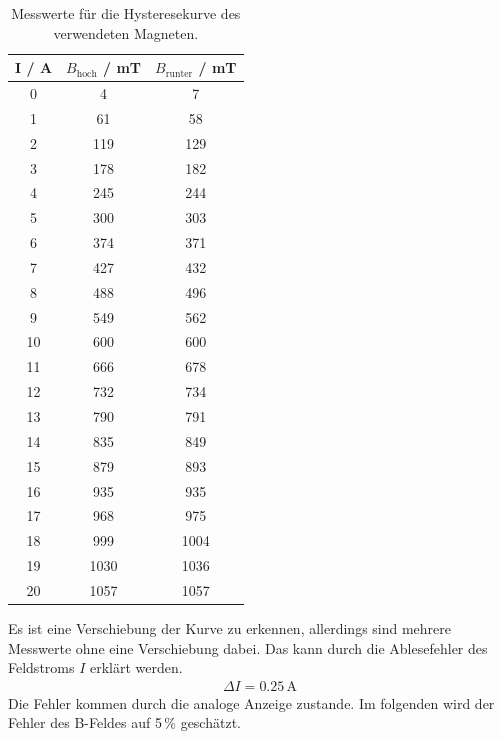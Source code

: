 \begin{table}[H] %
  \centering
  \caption{Messwerte für die Hysteresekurve des verwendeten Magneten.}
  \label{tab:Hysterese}
  \begin{tabular}{c | c c}
    I / A & $B_\text{hoch}$ / mT & $B_\text{runter}$ / mT \\
    \hline
    0 & 4 & 7 \\
    1 & 61 & 58 \\
    2 & 119 & 129 \\
    3 & 178 & 182 \\
    4 & 245 & 244 \\
    5 & 300 & 303 \\
    6 & 374 & 371 \\
    7 & 427 & 432 \\
    8 & 488 & 496 \\
    9 & 549 & 562 \\
    10 & 600 & 600 \\
    11 & 666 & 678 \\
    12 & 732 & 734 \\
    13 & 790 & 791 \\
    14 & 835 & 849 \\
    15 & 879 & 893 \\
    16 & 935 & 935 \\
    17 & 968 & 975 \\
    18 & 999 & 1004 \\
    19 & 1030 & 1036 \\
    20 & 1057 & 1057 \\
  \end{tabular}
\end{table}

Es ist eine Verschiebung der Kurve zu erkennen, allerdings sind mehrere Messwerte ohne eine Verschiebung dabei. Das kann durch die Ablesefehler des Feldstroms $I$ erklärt werden.
\begin{align*}
  \Delta I = 0.25\, \text{A}
\end{align*}
Die Fehler kommen durch die analoge Anzeige zustande. Im folgenden wird der Fehler des B-Feldes auf 5\,\% geschätzt.


